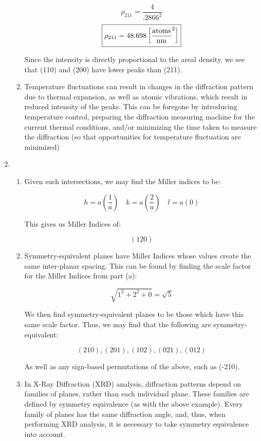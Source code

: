 \begin{enumerate}
\begin{enumerate}
        $$\rho_{211}=\frac{4}{.2866^2}$$
        $$\boxed{\rho_{211}=48.698\left[ \si{atoms\over\nano\meter\squared} \right]}$$

        Since the intensity is directly proportional to the areal density, we see that (110) and (200) have lower peaks than (211).

      \item Temperature fluctuations can result in changes in the diffraction pattern due to thermal expansion, as well as atomic vibrations, which result in reduced intensity of the peaks. This can be foregone by introducing temperature control, preparing the diffraction measuring machine for the current thermal conditions, and/or minimizing the time taken to measure the diffraction (so that opportunities for temperature fluctuation are minimized)

    \end{enumerate}

  \item

    \begin{enumerate}

      \item Given such intersections, we may find the Miller indices to be:

        $$h=a\left( \frac{1}{a} \right)\quad k=a\left( \frac{2}{a} \right)\quad l=a(0)$$

        This gives us Miller Indices of:

        $$\boxed{(120)}$$

      \item Symmetry-equivalent planes have Miller Indices whose values create the same inter-planar spacing. This can be found by finding the scale factor for the Miller Indices from part (a):

        $$\sqrt{1^2+2^2+0}=\sqrt{5}$$

        We then find symmetry-equivalent planes to be those which have this same scale factor. Thus, we may find that the following are symmetry-equivalent:

        $$\boxed{(210), (201), (102), (021), (012)}$$

        As well as any sign-based permutations of the above, such as (-210).

      \item In X-Ray Diffraction (XRD) analysis, diffraction patterns depend on families of planes, rather than each individual plane. These families are defined by symmetry equivalence (as with the above example). Every family of planes has the same diffraction angle, and, thus, when performing XRD analysis, it is necessary to take symmetry equivalence into account.


\end{enumerate}
\end{enumerate}
